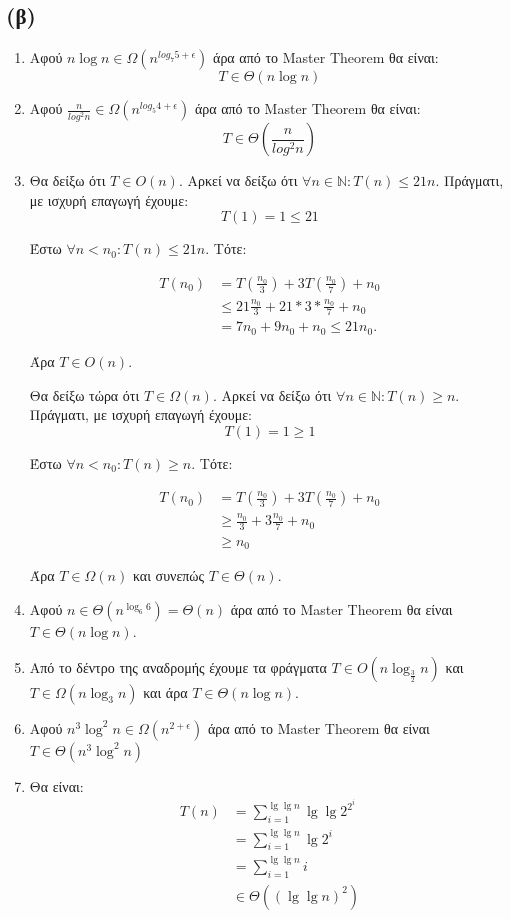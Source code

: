 \documentclass[11pt,a4paper]{book}
\begin{document}
\subsection*{(β)}

\begin{enumerate}
\item Αφού $n \log n \in \Omega( n^{log_7 5 + \epsilon} )$ άρα από το \textlatin{Master Theorem} θα είναι: 
\[ T \in \Theta( n \log n )\]
\item Αφού $\frac{n}{log^2 n} \in \Omega( n^{log_5 4 + \epsilon} )$ άρα από το \textlatin{Master Theorem} θα είναι:
\[ T \in \Theta( \frac{n}{log^2 n} ) \]
\item Θα δείξω ότι $T \in O( n )$. Αρκεί να δείξω ότι $\forall n \in \mathbb{N}: T( n ) \leq 21n$. Πράγματι, με ισχυρή επαγωγή έχουμε:
\[
T( 1 ) = 1 \leq 21
\]

Έστω $\forall n < n_0: T(n) \leq 21n$. Τότε:

\begin{align*}
T( n_0 ) & = T( \frac{n_0}{3} ) + 3T( \frac{n_0}{7} ) + n_0 \\
         & \leq 21 \frac{n_0}{3} + 21 * 3 * \frac{n_0}{7} + n_0 \\
         & = 7 n_0 + 9 n_0 + n_0 \leq 21 n_0.
\end{align*}

Άρα $T \in O( n )$.

Θα δείξω τώρα ότι $T \in \Omega( n )$. Αρκεί να δείξω ότι $\forall n \in \mathbb{N}: T( n ) \geq n$. Πράγματι, με ισχυρή επαγωγή έχουμε:
\[
T( 1 ) = 1 \geq 1
\]

Έστω $\forall n < n_0: T( n ) \geq n$. Τότε:

\begin{align*}
T( n_0 ) & = T( \frac{n_0}{3} ) + 3T( \frac{n_0}{7} ) + n_0\\
& \geq \frac{n_0}{3} + 3 \frac{n_0}{7} + n_0\\
& \geq n_0
\end{align*}

Άρα $T \in \Omega( n )$ και συνεπώς $T \in \Theta( n )$.

\item Αφού $n \in \Theta( n^{\log_6 6} ) = \Theta( n )$ άρα από το \textlatin{Master Theorem} θα είναι $T \in \Theta( n \log n )$.
\item Από το δέντρο της αναδρομής έχουμε τα φράγματα $T \in O( n \log_{\frac{3}{2}}n )$ και $T \in \Omega( n \log_3 n )$ και άρα $T \in \Theta( n \log n )$.
\item Αφού $n^3 \log^2 n \in \Omega( n^{2 + \epsilon} ) $ άρα από το \textlatin{Master Theorem} θα είναι $T \in \Theta( n^3 \log^2 n )$ 
\item Θα είναι:
\begin{align*}
T( n ) & = \sum_{i=1}^{\lg\lg n} \lg\lg 2^{2^i}\\
       & = \sum_{i=1}^{\lg\lg n} \lg 2^i\\
       & = \sum_{i=1}^{\lg\lg n} i\\
       & \in \Theta( ( \lg\lg n )^2 )\\
\end{align*}
       

\end{enumerate}
\end{document}
